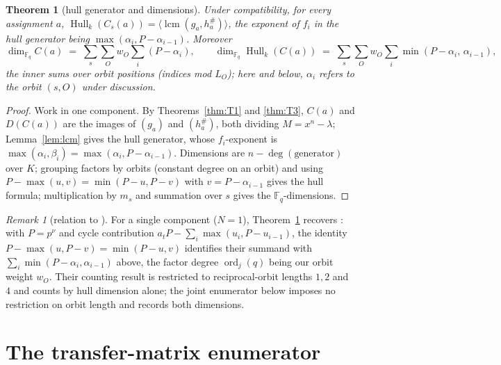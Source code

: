 \documentclass[10pt,journal,draftclsnofoot,onecolumn]{IEEEtran}
\newtheorem{theorem}{Theorem}[section]
\theoremstyle{definition}
\theoremstyle{remark}
\newtheorem*{remark}{Remark}
\newcommand{\Fq}{\mathbb{F}_q}
\newcommand{\Hull}{\operatorname{Hull}}
\newcommand{\lcm}{\operatorname{lcm}}
\begin{document}
\begin{theorem}[hull generator and dimensions]\label{thm:T4}
Under compatibility, for every assignment \(a\),
\(\Hull_k(C_s(a)) = \langle \lcm(g_a, h_a^{\#}) \rangle\), the exponent
of \(f_i\) in the hull generator being \(\max(\alpha_i, P-\alpha_{i-1})\).
Moreover
\[
\dim_{\Fq} C(a) \;=\; \sum_{s} \sum_{O} w_O \sum_{i} (P - \alpha_i),
\qquad
\dim_{\Fq} \Hull_k(C(a)) \;=\; \sum_{s} \sum_{O} w_O \sum_i
\min(P-\alpha_i,\, \alpha_{i-1}),
\]
the inner sums over orbit positions (indices mod \(L_O\)); here and
below, \(\alpha_i\) refers to the orbit \((s,O)\) under discussion.
\end{theorem}

\begin{proof}
Work in one component. By Theorems~\ref{thm:T1} and \ref{thm:T3},
\(C(a)\) and \(D(C(a))\) are the images of \((g_a)\) and
\((h_a^{\#})\), both dividing \(M = x^n-\lambda\); Lemma~\ref{lem:lcm}
gives the hull generator, whose \(f_i\)-exponent is
\(\max(\alpha_i, \beta_i) = \max(\alpha_i, P-\alpha_{i-1})\). Dimensions
are \(n - \deg(\text{generator})\) over \(K\); grouping factors by
orbits (constant degree on an orbit) and using
\(P - \max(u,v) = \min(P-u, P-v)\) with \(v = P-\alpha_{i-1}\) gives the
hull formula; multiplication by \(m_s\) and summation over \(s\) gives
the \(\Fq\)-dimensions.
\end{proof}

\begin{remark}[relation to \cite{DPI2023}]
For a single component (\(N = 1\)), Theorem~\ref{thm:T4} recovers
\cite[Theorem~3]{DPI2023}: with \(P = p^{\nu}\) and cycle contribution
\(a_t P - \sum_i \max(u_i, P - u_{i-1})\), the identity
\(P - \max(u, P - v) = \min(P - u, v)\) identifies their summand with
\(\sum_i \min(P - \alpha_i, \alpha_{i-1})\) above, the factor degree
\(\operatorname{ord}_j(q)\) being our orbit weight \(w_O\). Their
counting result \cite[Theorem~4]{DPI2023} is restricted to
reciprocal-orbit lengths \(1, 2\) and \(4\) and counts by hull
dimension alone; the joint enumerator below imposes no restriction on
orbit length and records both dimensions.
\end{remark}

\section{The transfer-matrix enumerator}\label{sec:enumerator}
\end{document}
